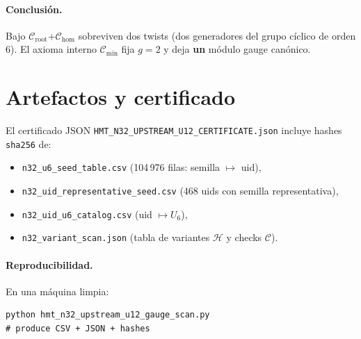 \documentclass[11pt]{article}
\begin{document}
\paragraph{Conclusi\'on.}
Bajo $\mathcal C_\mathrm{root}$+$\mathcal C_\mathrm{hom}$ sobreviven dos twists (dos generadores del grupo c\'iclico de orden 6). El axioma interno $\mathcal C_\mathrm{min}$ fija $g=2$ y deja \textbf{un} m\'odulo gauge can\'onico.

\section{Artefactos y certificado}
El certificado JSON \texttt{HMT\_N32\_UPSTREAM\_U12\_CERTIFICATE.json} incluye hashes \texttt{sha256} de:
\begin{itemize}
  \item \texttt{n32\_u6\_seed\_table.csv} (104\,976 filas: semilla $\mapsto$ uid),
  \item \texttt{n32\_uid\_representative\_seed.csv} (468 uids con semilla representativa),
  \item \texttt{n32\_uid\_u6\_catalog.csv} (uid $\mapsto U_6$),
  \item \texttt{n32\_variant\_scan.json} (tabla de variantes $\mathcal H$ y checks $\mathcal C$).
\end{itemize}

\paragraph{Reproducibilidad.}
En una m\'aquina limpia:
\begin{lstlisting}
python hmt_n32_upstream_u12_gauge_scan.py
# produce CSV + JSON + hashes
\end{lstlisting}
\end{document}
